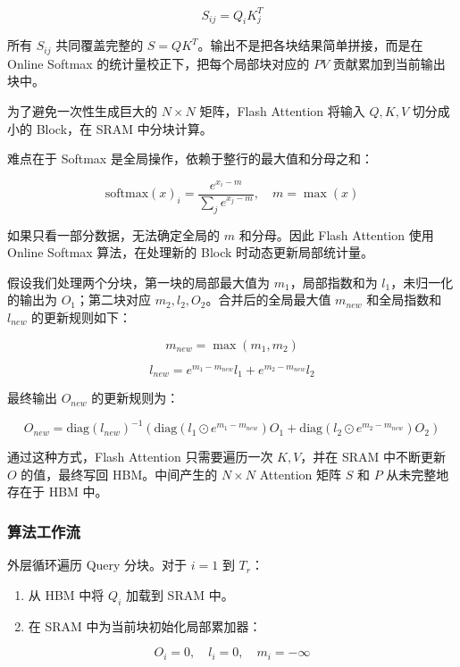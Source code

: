 \[
S_{ij} = Q_iK_j^T
\]

所有 \(S_{ij}\) 共同覆盖完整的 \(S = QK^T\)。输出不是把各块结果简单拼接，而是在 Online Softmax 的统计量校正下，把每个局部块对应的 \(PV\) 贡献累加到当前输出块中。

为了避免一次性生成巨大的 \(N \times N\) 矩阵，Flash Attention 将输入 \(Q,K,V\) 切分成小的 Block，在 SRAM 中分块计算。

难点在于 Softmax 是全局操作，依赖于整行的最大值和分母之和：

\[
\mathrm{softmax}(x)_i = \frac{e^{x_i-m}}{\sum_j e^{x_j-m}},\quad m = \max(x)
\]

如果只看一部分数据，无法确定全局的 \(m\) 和分母。因此 Flash Attention 使用 Online Softmax 算法，在处理新的 Block 时动态更新局部统计量。

假设我们处理两个分块，第一块的局部最大值为 \(m_1\)，局部指数和为 \(l_1\)，未归一化的输出为 \(O_1\)；第二块对应 \(m_2,l_2,O_2\)。合并后的全局最大值 \(m_{new}\) 和全局指数和 \(l_{new}\) 的更新规则如下：

\[
m_{new} = \max(m_1,m_2)
\]

\[
l_{new} = e^{m_1-m_{new}}l_1 + e^{m_2-m_{new}}l_2
\]

最终输出 \(O_{new}\) 的更新规则为：

\[
O_{new} = \mathrm{diag}(l_{new})^{-1}\left(\mathrm{diag}\left(l_1 \odot e^{m_1-m_{new}}\right)O_1 + \mathrm{diag}\left(l_2 \odot e^{m_2-m_{new}}\right)O_2\right)
\]

通过这种方式，Flash Attention 只需要遍历一次 \(K,V\)，并在 SRAM 中不断更新 \(O\) 的值，最终写回 HBM。中间产生的 \(N \times N\) Attention 矩阵 \(S\) 和 \(P\) 从未完整地存在于 HBM 中。

\hypertarget{ux7b97ux6cd5ux5de5ux4f5cux6d41-1}{%
\subsubsection{算法工作流}\label{ux7b97ux6cd5ux5de5ux4f5cux6d41-1}}

外层循环遍历 Query 分块。对于 \(i = 1\) 到 \(T_r\)：

\begin{enumerate}
\def\labelenumi{\arabic{enumi}.}
\tightlist
\item
  从 HBM 中将 \(Q_i\) 加载到 SRAM 中。
\item
  在 SRAM 中为当前块初始化局部累加器：
\end{enumerate}

\[
O_i = 0,\quad l_i = 0,\quad m_i = -\infty
\]

